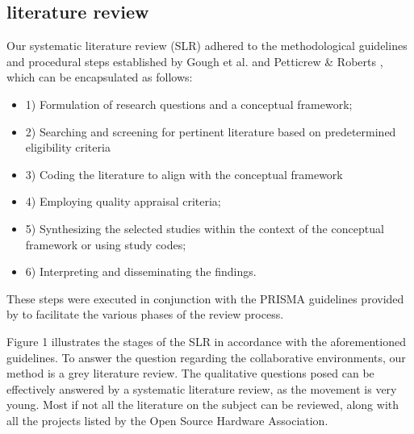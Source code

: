 \subsection{literature review}

Our systematic literature review (SLR) adhered to the methodological guidelines and procedural steps established by Gough et al. \cite{gough2017introduction} and Petticrew \& Roberts \cite{petticrew2008systematic}, which can be encapsulated as follows:
\begin{itemize}
    \item 1) Formulation of research questions and a conceptual framework; 
    \item 2) Searching and screening for pertinent literature based on predetermined eligibility criteria
    \item 3) Coding the literature to align with the conceptual framework
    \item 4) Employing quality appraisal criteria;
    \item 5) Synthesizing the selected studies within the context of the conceptual framework or using study codes;
    \item 6) Interpreting and disseminating the findings. 
\end{itemize}
These steps were executed in conjunction with the PRISMA guidelines provided by \cite{page2021prisma} to facilitate the various phases of the review process. 

Figure 1 
illustrates the stages of the SLR in accordance with the aforementioned guidelines.
To answer the question regarding the collaborative environments, our method is a grey literature review. 
The qualitative questions posed can be effectively answered by a systematic literature review, as the movement is very young. 
Most if not all the literature on the subject can be reviewed, along with all the projects listed by the Open Source Hardware Association.



